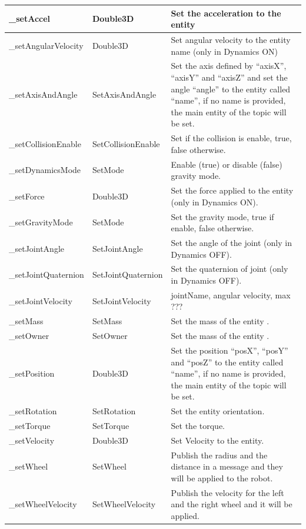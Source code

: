 \documentclass[notitlepage]{report}
\begin{document}
\begin{supertabular}{|p{3cm}|p{4.5cm}|p{7cm}|}
  	\_setAccel & 
  		Double3D
  		& Set the acceleration to the entity\\
  	\hline
  	\_setAngularVelocity & 
  		Double3D
  		& Set angular velocity to the entity name (only in Dynamics ON)\\
  	\hline
  	\_setAxisAndAngle & 
  		SetAxisAndAngle
  		& Set the axis defined by ``axisX'', ``axisY'' and ``axisZ'' and set the angle ``angle'' to the entity called ``name'', if no name is provided, the main entity of the topic will be set.\\
  	\hline
  	\_setCollisionEnable & 
  		SetCollisionEnable
  		& Set if the collision is enable, true, false otherwise.\\
  	\hline
  	\_setDynamicsMode & 
  		SetMode
  		& Enable (true) or disable (false) gravity mode.\\
  	\hline
  	\_setForce & 
  		Double3D
  		& Set the force applied to the entity (only in Dynamics ON).\\
  	\hline
  	\_setGravityMode & 
  		SetMode
  		& Set the gravity mode, true if enable, false otherwise.\\
  	\hline
  	\_setJointAngle & 
  		SetJointAngle
  		& Set the angle of the joint (only in Dynamics OFF).\\
  	\hline
  	\_setJointQuaternion & 
  		SetJointQuaternion
  		& Set the quaternion of joint (only in Dynamics OFF).\\
  	\hline
  	\_setJointVelocity & 
  		SetJointVelocity
  		& jointName, angular velocity, max ???\\
  	\hline
  	\_setMass & 
  		SetMass
  		& Set the mass of the entity .\\
  	\hline
  	\_setOwner & 
  		SetOwner
  		& Set the mass of the entity .\\
  	\hline
  	\_setPosition & 
  		Double3D
  		& Set the position ``posX'', ``posY'' and ``posZ'' to the entity called ``name'', if no name is provided, the main entity of the topic will be set.\\
  	\hline
  	\_setRotation & 
  		SetRotation
  		& Set the entity orientation.\\
  	\hline
  	\_setTorque & 
  		SetTorque
  		& Set the torque.\\
  	\hline
  	\_setVelocity & 
  		Double3D
  		& Set Velocity to the entity.\\
  	\hline
  	\_setWheel & 
  		SetWheel & Publish the radius and the distance in a message and they will be applied to the robot.\\
  	\hline
  	\_setWheelVelocity & 
  		SetWheelVelocity
  		& Publish the velocity for the left and the right wheel and it will be applied.\\
  	\hline
\end{supertabular}
\end{document}
